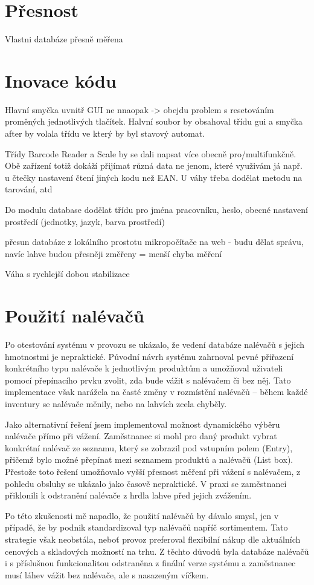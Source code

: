 \section{Přesnost}
Vlastni databáze přesně měřena

\section{Inovace kódu}

Hlavní smyčka uvnitř GUI ne nnaopak -> obejdu problem s resetováním proměných jednotlivých tlačítek. Halvní soubor by obsahoval třídu gui a smyčka after by volala třídu ve který by byl stavový automat.

Třídy Barcode Reader a Scale by se dali napsat více obecně pro/multifunkčně. Obě zařízení totiž dokáží přijímat různá data ne jenom, které využivám já např. u čtečky nastavení čtení jiných kodu než EAN. U váhy třeba dodělat metodu na tarování, atd

Do modulu database dodělat třídu pro jména pracovníku, heslo, obecné nastavení prostředí (jednotky, jazyk, barva prostředí)

přesun databáze z lokálního prostotu mikropočítače na web - budu dělat správu, navíc lahve budou přesněji změřeny = menší chyba měření 

Váha s rychlejší dobou stabilizace

\section{Použití nalévačů}
Po otestování systému v provozu se ukázalo, že vedení databáze nalévačů s jejich hmotnostmi je nepraktické. Původní návrh systému zahrnoval pevné přiřazení konkrétního typu nalévače k jednotlivým produktům a umožňoval uživateli pomocí přepínacího prvku zvolit, zda bude vážit s nalévačem či bez něj. Tato implementace však narážela na časté změny v rozmístění nalévačů – během každé inventury se nalévače měnily, nebo na lahvích zcela chyběly.

Jako alternativní řešení jsem implementoval možnost dynamického výběru nalévače přímo při vážení. Zaměstnanec si mohl pro daný produkt vybrat konkrétní nalévač ze seznamu, který se zobrazil pod vstupním polem (Entry), přičemž bylo možné přepínat mezi seznamem produktů a nalévačů (List box). Přestože toto řešení umožňovalo vyšší přesnost měření při vážení s nalévačem, z pohledu obsluhy se ukázalo jako časově nepraktické. V praxi se zaměstnanci přiklonili k odstranění nalévače z hrdla lahve před jejich zvážením.

Po této zkušenosti mě napadlo, že použití nalévačů by dávalo smysl, jen v případě, že by podnik standardizoval typ nalévačů napříč sortimentem. Tato strategie však neobstála, neboť provoz preferoval flexibilní nákup dle aktuálních cenových a skladových možností na trhu. Z těchto důvodů byla databáze nalévačů i s příslušnou funkcionalitou odstraněna z finální verze systému a zaměstnanec musí láhev vážit bez nalévače, ale s nasazeným víčkem.